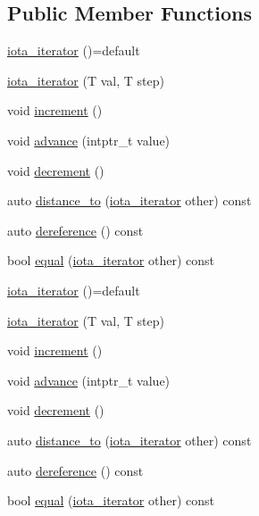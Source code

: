 \subsection*{Public Member Functions}
\begin{DoxyCompactItemize}
\item 
\mbox{\hyperlink{structrah_1_1view_1_1iota__iterator_ac6bb0b67f8d778854c3cb25aec3e9160}{iota\+\_\+iterator}} ()=default
\item 
\mbox{\hyperlink{structrah_1_1view_1_1iota__iterator_a7807733a9a9609f8b9652e270551dc9b}{iota\+\_\+iterator}} (T val, T step)
\item 
void \mbox{\hyperlink{structrah_1_1view_1_1iota__iterator_a52be6587654c9783137bf31d800f315d}{increment}} ()
\item 
void \mbox{\hyperlink{structrah_1_1view_1_1iota__iterator_afdc7732c688daecb60d17b45a678e1f1}{advance}} (intptr\+\_\+t value)
\item 
void \mbox{\hyperlink{structrah_1_1view_1_1iota__iterator_ab11421ab7ec8d986bdf7ef5f930d0b43}{decrement}} ()
\item 
auto \mbox{\hyperlink{structrah_1_1view_1_1iota__iterator_a3662abe8721e4c5c7bbc4214e36c4920}{distance\+\_\+to}} (\mbox{\hyperlink{structrah_1_1view_1_1iota__iterator}{iota\+\_\+iterator}} other) const
\item 
auto \mbox{\hyperlink{structrah_1_1view_1_1iota__iterator_ae31c733c52f77c7c199802db6638541d}{dereference}} () const
\item 
bool \mbox{\hyperlink{structrah_1_1view_1_1iota__iterator_ada1691e363efa9b5c945a302296e63d5}{equal}} (\mbox{\hyperlink{structrah_1_1view_1_1iota__iterator}{iota\+\_\+iterator}} other) const
\item 
\mbox{\hyperlink{structrah_1_1view_1_1iota__iterator_ac6bb0b67f8d778854c3cb25aec3e9160}{iota\+\_\+iterator}} ()=default
\item 
\mbox{\hyperlink{structrah_1_1view_1_1iota__iterator_a7807733a9a9609f8b9652e270551dc9b}{iota\+\_\+iterator}} (T val, T step)
\item 
void \mbox{\hyperlink{structrah_1_1view_1_1iota__iterator_a52be6587654c9783137bf31d800f315d}{increment}} ()
\item 
void \mbox{\hyperlink{structrah_1_1view_1_1iota__iterator_afdc7732c688daecb60d17b45a678e1f1}{advance}} (intptr\+\_\+t value)
\item 
void \mbox{\hyperlink{structrah_1_1view_1_1iota__iterator_ab11421ab7ec8d986bdf7ef5f930d0b43}{decrement}} ()
\item 
auto \mbox{\hyperlink{structrah_1_1view_1_1iota__iterator_a3662abe8721e4c5c7bbc4214e36c4920}{distance\+\_\+to}} (\mbox{\hyperlink{structrah_1_1view_1_1iota__iterator}{iota\+\_\+iterator}} other) const
\item 
auto \mbox{\hyperlink{structrah_1_1view_1_1iota__iterator_ae31c733c52f77c7c199802db6638541d}{dereference}} () const
\item 
bool \mbox{\hyperlink{structrah_1_1view_1_1iota__iterator_ada1691e363efa9b5c945a302296e63d5}{equal}} (\mbox{\hyperlink{structrah_1_1view_1_1iota__iterator}{iota\+\_\+iterator}} other) const
\end{DoxyCompactItemize}
